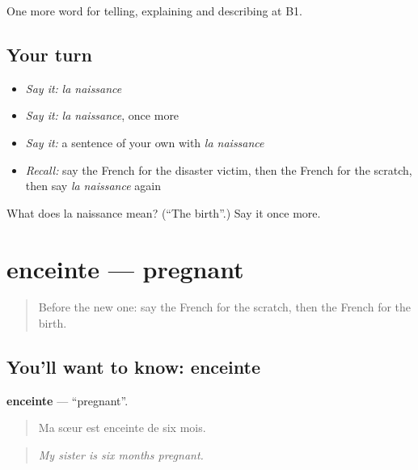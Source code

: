 \begin{grammarlens}[title={What you've built}]
One more word for telling, explaining and describing at B1.
\end{grammarlens}

\subsection*{Your turn}
\begin{itemize}
\raggedright
  \item \emph{Say it:} \emph{la naissance}
  \item \emph{Say it:} \emph{la naissance}, once more
  \item \emph{Say it:} a sentence of your own with \emph{la naissance}
  \item \emph{Recall:} say the French for the disaster victim, then the French for the scratch, then say \emph{la naissance} again
\end{itemize}

\begin{tcolorbox}[breakable,colback=teal!4,colframe=teal!35!black,title={Before you move on}]
What does la naissance mean? (\textquotedblleft{}The birth\textquotedblright{}.) Say it once more.
\end{tcolorbox}
\section[enceinte]{enceinte — pregnant}

\label{lesson:FR-C308-enceinte}



\begin{quote}
Before the new one: say the French for the scratch, then the French for the birth.
\end{quote}

\subsection*{You'll want to know: enceinte}
\textbf{enceinte} — \textquotedblleft{}pregnant\textquotedblright{}.

\begin{quote}
Ma sœur est enceinte de six mois.
\end{quote}

\begin{quote}
\emph{My sister is six months pregnant.}
\end{quote}

